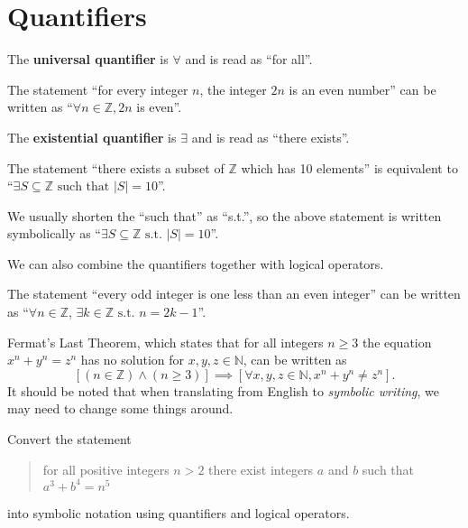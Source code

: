 \section{Quantifiers}
\begin{definition}
    The \textbf{universal quantifier} is $\forall$ and is read as ``for all''.
\end{definition}
\begin{example}
    The statement ``for every integer $n$, the integer $2n$ is an even number'' can be written as ``$\forall n \in \mathbb{Z}, 2n$ is even''.
\end{example}

\begin{definition}
    The \textbf{existential quantifier} is $\exists$ and is  read as ``there exists''.
\end{definition}
\begin{example}
    The statement ``there exists a subset of $\mathbb{Z}$ which has 10 elements'' is equivalent to ``$\exists S \subseteq \mathbb{Z} \text{ such that } |S| = 10$''.
\end{example}
\begin{remark}
    We usually shorten the ``such that'' as ``s.t.'', so the above statement is written symbolically as ``$\exists S \subseteq \mathbb{Z} \text{ s.t. } |S| = 10$''.
\end{remark}

We can also combine the quantifiers together with logical operators.
\begin{example}
    The statement ``every odd integer is one less than an even integer'' can be written as ``$\forall n \in \mathbb{Z}$, $\exists k \in \mathbb{Z} \text { s.t. } n = 2k - 1$''.
\end{example}
\begin{example}
    Fermat's Last Theorem, which states that for all integers $n\geq 3$ the equation $x^n + y^n = z^n$ has no solution for $x, y, z \in \mathbb{N}$, can be written as
    \[
        \left[(n \in \mathbb{Z}) \land (n \geq 3)\right] \implies \left[\forall x, y, z \in \mathbb{N}, x^n + y^n \neq z^n\right].
    \]
    It should be noted that when translating from English to \textit{symbolic writing}, we may need to change some things around.
\end{example}

\begin{exercise}
    Convert the statement
    \begin{quote}
        for all positive integers $n > 2$ there exist integers $a$ and $b$ such that $a^3 + b^4 = n^5$
    \end{quote}
    into symbolic notation using quantifiers and logical operators.
\end{exercise}

